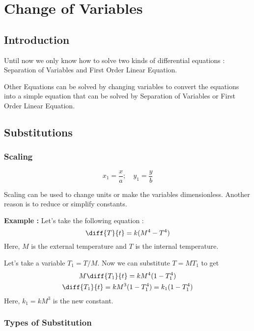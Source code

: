 


\chapter{Change of Variables}

\bigbreak

\section{Introduction}

Until now we only know how to solve two kinds of differential equations :
Separation of Variables and First Order Linear Equation.

Other Equations can be solved by changing variables to convert the equations into a simple equation
that can be solved by Separation of Variables or First Order Linear Equation.

\section{Substitutions}

\subsection{Scaling}

$$ x_1 = \frac{x}{a} ; \quad y_1 = \frac{y}{b} $$

Scaling can be used to change units or make the variables dimensionless.
Another reason is to reduce or simplify constants.

{\bf Example : } Let's take the following equation :
$$ \diff{T}{t} = k(M^4 - T^4) $$
Here, $M$ is the external temperature and $T$ is the internal temperature.

Let's take a variable $T_1 = T / M$.
Now we can substitute $T = M T_1$ to get
\begin{gather*}
	M \diff{T_1}{t} = k M^4(1 - T_1^4) \\
	\diff{T_1}{t} = k M^3 (1 - T_1^4) = k_1 (1 - T_1^4)
\end{gather*}
Here, $k_1 = k M^3$ is the new constant.

\subsection{Types of Substitution}

